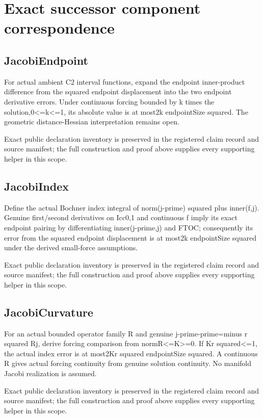 \documentclass[11pt]{article}
\theoremstyle{definition}
\theoremstyle{remark}
\numberwithin{equation}{section}
\begin{document}
\clearpage
\section{Exact successor component correspondence}

\subsection{JacobiEndpoint}
\label{daytime-v010:jacobiendpoint}
For actual ambient C2 interval functions, expand the endpoint inner-product difference from the squared endpoint displacement into the two endpoint derivative errors. Under continuous forcing bounded by k times the solution,0<=k<=1, its absolute value is at most2k endpointSize squared. The geometric distance-Hessian interpretation remains open.

Exact public declaration inventory is preserved in the registered claim record and source manifest; the full construction and proof above supplies every supporting helper in this scope.

\subsection{JacobiIndex}
\label{daytime-v010:jacobiindex}
Define the actual Bochner index integral of norm(j-prime) squared plus inner(f,j). Genuine first/second derivatives on Icc0,1 and continuous f imply its exact endpoint pairing by differentiating inner(j-prime,j) and FTOC; consequently its error from the squared endpoint displacement is at most2k endpointSize squared under the derived small-force assumptions.

Exact public declaration inventory is preserved in the registered claim record and source manifest; the full construction and proof above supplies every supporting helper in this scope.

\subsection{JacobiCurvature}
\label{daytime-v010:jacobicurvature}
For an actual bounded operator family R and genuine j-prime-prime=minus r squared Rj, derive forcing comparison from normR<=K>=0. If Kr squared<=1, the actual index error is at most2Kr squared endpointSize squared. A continuous R gives actual forcing continuity from genuine solution continuity. No manifold Jacobi realization is assumed.

Exact public declaration inventory is preserved in the registered claim record and source manifest; the full construction and proof above supplies every supporting helper in this scope.
\end{document}
